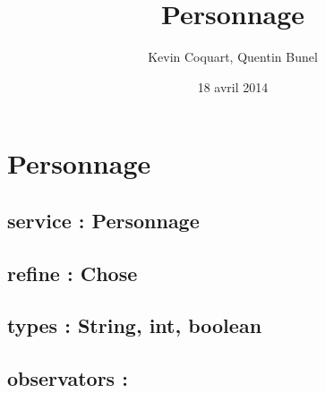 \documentclass[11pt]{article}
\title{Personnage}
\author{Kevin Coquart, Quentin Bunel}
\date{18 avril 2014}
\begin{document}
\maketitle

\setcounter{tocdepth}{3}
\tableofcontents
\vspace*{1cm}
\section{Personnage}
\label{sec-1}

\subsection{service : Personnage}
\label{sec-1.1}

\subsection{refine : Chose}
\label{sec-1.2}

\subsection{types : String, int, boolean}
\label{sec-1.3}



\subsection{observators :}
\label{sec-1.4}

\subsubsection{}
\end{document}
